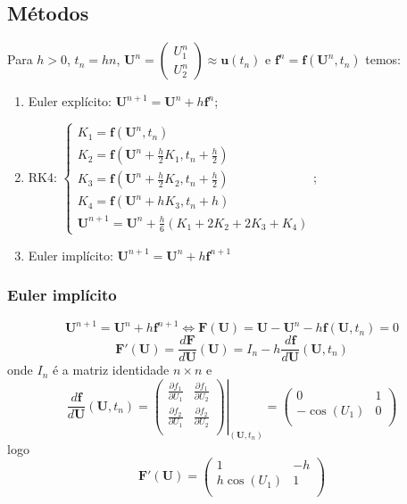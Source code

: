 \documentclass{article}
\newcommand{\bd}[1]{\mathbf{#1}} %
\begin{document}
    \subsection{Métodos}
    Para $h > 0$, $t_n = hn$, $\bd{U}^n = \begin{pmatrix}
        U_1^n\\
        U_2^n
    \end{pmatrix} \approx \bd{u}(t_n)$ e $\bd{f}^n = \bd{f}(\bd{U}^n,t_n)$ temos:
    \begin{enumerate}
        \item Euler explícito: $\bd{U}^{n+1} = \bd{U}^n + h\bd{f}^n$;
        \item RK4: $\begin{cases}
            K_1 = \bd{f}(\bd{U}^n,t_n)\\
            K_2 = \bd{f}(\bd{U}^n+\frac{h}{2}K_1,t_n+\frac{h}{2})\\
            K_3 = \bd{f}(\bd{U}^n+\frac{h}{2}K_2,t_n+\frac{h}{2})\\
            K_4 = \bd{f}(\bd{U}^n+hK_3,t_n+h)\\
            \bd{U}^{n+1} = \bd{U}^n + \frac{h}{6}(K_1 + 2K_2 + 2K_3 + K_4)
        \end{cases}$;
        \item Euler implícito: $\bd{U}^{n+1} = \bd{U}^n + h\bd{f}^{n+1}$
    \end{enumerate}

    \subsubsection{Euler implícito}
    \[\bd{U}^{n+1} = \bd{U}^n + h\bd{f}^{n+1} \iff \bd{F}(\bd{U}) = \bd{U} - \bd{U}^n - h\bd{f}(\bd{U},t_n) = 0\]
    \[\bd{F}'(\bd{U}) = \frac{d\bd{F}}{d\bd{U}}(\bd{U}) = I_n - h\frac{d\bd{f}}{d\bd{U}}(\bd{U},t_n)\]
    onde $I_n$ é a matriz identidade $n \times n$ e
    \[\frac{d\bd{f}}{d\bd{U}}(\bd{U},t_n) = \left.\begin{pmatrix}
        \frac{\partial f_1}{\partial U_1} & \frac{\partial f_1}{\partial U_2}\\
        \frac{\partial f_2}{\partial U_1} & \frac{\partial f_2}{\partial U_2}\\
    \end{pmatrix}\right|_{(\bd{U},t_n)} = \begin{pmatrix}
        0 & 1\\
        -\cos(U_1) & 0\\
    \end{pmatrix}\]
    logo
    \[\bd{F}'(\bd{U}) = \begin{pmatrix}
        1 & -h\\
        h\cos(U_1) & 1\\
    \end{pmatrix}\]
\end{document}
